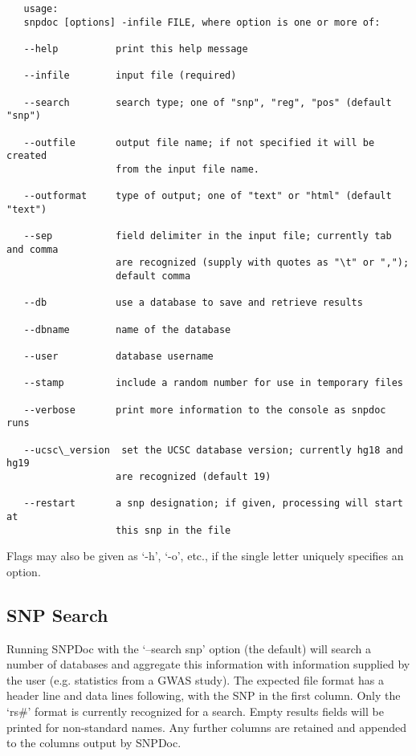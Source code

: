 \documentclass[11pt]{article}
\begin{document}
   \begin{verbatim}
   usage:
   snpdoc [options] -infile FILE, where option is one or more of:

   --help          print this help message

   --infile        input file (required)

   --search        search type; one of "snp", "reg", "pos" (default "snp")

   --outfile       output file name; if not specified it will be created
                   from the input file name.

   --outformat     type of output; one of "text" or "html" (default "text")

   --sep           field delimiter in the input file; currently tab and comma
                   are recognized (supply with quotes as "\t" or ",");
                   default comma

   --db            use a database to save and retrieve results

   --dbname        name of the database

   --user          database username

   --stamp         include a random number for use in temporary files

   --verbose       print more information to the console as snpdoc runs

   --ucsc\_version  set the UCSC database version; currently hg18 and hg19
                   are recognized (default 19)

   --restart       a snp designation; if given, processing will start at
                   this snp in the file

   \end{verbatim}

   Flags may also be given as `-h', `-o', etc., if the single letter uniquely
   specifies an option.
   
\subsection{SNP Search}
\label{sec-4-2}


   Running SNPDoc with the `--search snp' option (the default) will search a
   number of databases and aggregate this information with information supplied
   by the user (e.g. statistics from a GWAS study).  The expected file format
   has a header line and data lines following, with the SNP in the first column.
   Only the `rs\#' format is currently recognized for a search.  Empty results
   fields will be printed for non-standard names.  Any further columns are
   retained and appended to the columns output by SNPDoc.
\end{document}
